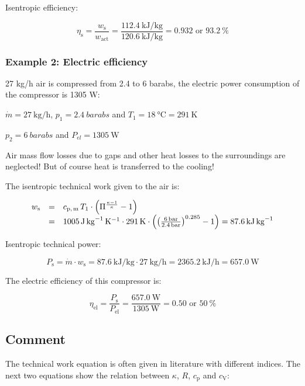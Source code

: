 \documentclass[11pt,a4paper,english,twoside]{scrreprt}
\begin{document}
Isentropic efficiency:

\[
\eta_\text{s} =\frac{w_\text{s}}{w_\text{act}} =\frac{\SI{112.4}{\kilo\joule\per\kilogram}}{\SI{120.6}{\kilo\joule\per\kilogram}} = \num{0.932} \mbox{ or } \SI{93.2}{\percent}
\]



\subsubsection{Example 2: Electric efficiency}

27 kg/h air is compressed from 2.4 to 6 barabs, the electric power consumption of the compressor is 1305 W:

$\dot m = \SI{27}{\kilogram\per\hour}$, $p_1 = \SI{2.4}{barabs}$ and $T_1 = \SI{18}{\degreeCelsius} = \SI{291}{\kelvin}$

$p_2 = \SI{6}{barabs}$ and $P_{el} = \SI{1305}{\watt}$


Air mass flow losses due to gaps and other heat losses to the surroundings are neglected! But of course heat is transferred to the cooling!

The isentropic technical work given to the air is:

\[\begin{array}{lcl}
w_\text{s} &=& c_\text{p,\,m} \, T_1 \cdot \left(\Pi ^{\frac{\kappa -1}{\kappa } } -1\right)\\
          &=& \SI{1005}{\joule\per\kilogram\per\kelvin}  \cdot \SI{291}{\kelvin} \cdot \left(\left(\frac{\SI{6}{\bar}}{\SI{2.4}{\bar}} \right)^{0.285} -1\right)=\SI{87.6}{\kilo\joule\per\kilogram}
\end{array}\]

Isentropic technical power:

\[
P_\text{s} = \dot{m} \cdot w_\text{s}  = \SI{87.6}{\kilo\joule\per\kilogram} \cdot \SI{27}{\kilogram\per\hour} = \SI{2365.2}{\kilo\joule\per\hour} = \SI{657.0}{\watt}
\]


The electric efficiency of this compressor is:

\[
\eta_\text{el} =\frac{P_\text{s}}{P_\text{el}} = \frac{\SI{657.0}{\watt}}{\SI{1305}{\watt}} = \num{0.50} \mbox{ or } \SI{50}{\percent}
\]



\subsection{Comment}

The technical work equation is often given in literature with different indices. The next two equations show the relation between $\kappa$, $R$, $c_\text{p}$ and $c_\text{V}$:
\end{document}
